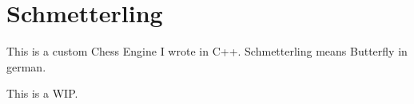 \chapter{Schmetterling}
\hypertarget{md_README}{}\label{md_README}
\label{md_README_autotoc_md0}%
%


This is a custom Chess Engine I wrote in C++. Schmetterling means \textquotesingle{}Butterfly\textquotesingle{} in german.

This is a WIP. 